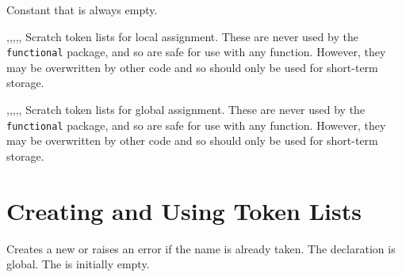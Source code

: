 \documentclass[oneside]{book}
\begin{document}
\begin{variable}{\cEmptyTl}
Constant that is always empty.
\end{variable}


\begin{variable}{\lTmpaTl,\lTmpbTl,\lTmpcTl,\lTmpiTl,\lTmpjTl,\lTmpkTl}
Scratch token lists for local assignment. These are never used by
the \verb!functional! package, and so are safe for use with any
function. However, they may be overwritten by other
code and so should only be used for short-term storage.
\end{variable}

\begin{variable}{\gTmpaTl,\gTmpbTl,\gTmpcTl,\gTmpiTl,\gTmpjTl,\gTmpkTl}
Scratch token lists for global assignment. These are never used by
the \verb!functional! package, and so are safe for use with any
function. However, they may be overwritten by other
code and so should only be used for short-term storage.
\end{variable}

\section{Creating and Using Token Lists}

\begin{function}{\TlNew}
\begin{syntax}
 
\end{syntax}
Creates a new  or raises an error if the
name is already taken. The declaration is global. The
 is initially empty.
\begin{codehigh}
\TlNew \lFooSomeTl
\end{codehigh}
\end{function}
\end{document}
